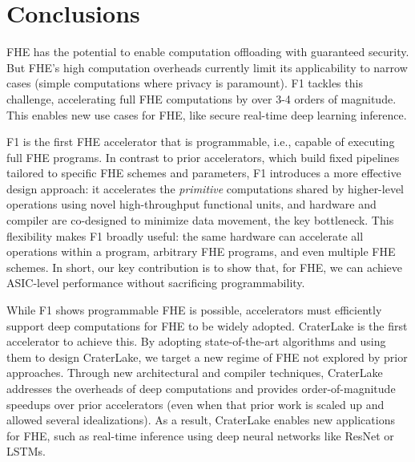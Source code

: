 \chapter{Conclusions}\label{sec:conclusion}

FHE has the potential to enable computation offloading with guaranteed
security. But FHE's high computation overheads currently limit its
applicability to narrow cases (simple computations where privacy is paramount).
F1 tackles this challenge, accelerating full FHE computations by over 3-4
orders of magnitude. This enables new use cases for FHE, like secure real-time
deep learning inference.

F1 is the first FHE accelerator that is programmable, i.e., capable of
executing full FHE programs. In contrast to prior accelerators, which build
fixed pipelines tailored to specific FHE schemes and parameters, F1 introduces
a more effective design approach: it accelerates the \emph{primitive}
computations shared by higher-level operations using novel high\hyp{}throughput
functional units, and hardware and compiler are co-designed to minimize data
movement, the key bottleneck. This flexibility makes F1 broadly useful: the
same hardware can accelerate all operations within a program, arbitrary FHE
programs, and even multiple FHE schemes. In short, our key contribution is to
show that, for FHE, we can achieve ASIC-level performance without sacrificing
programmability.

While F1 shows programmable FHE is possible, accelerators must efficiently
support deep computations for FHE to be widely adopted. CraterLake is the first
accelerator to achieve this. By adopting state-of-the-art algorithms and using
them to design CraterLake, we target a new regime of FHE not explored by prior
approaches. Through new architectural and compiler techniques, CraterLake addresses
the overheads of deep computations and provides order-of-magnitude speedups
over prior accelerators (even when that prior work is scaled up and allowed
several idealizations). As a result, CraterLake enables new applications for FHE,
such as real-time inference using deep neural networks like ResNet or LSTMs.

